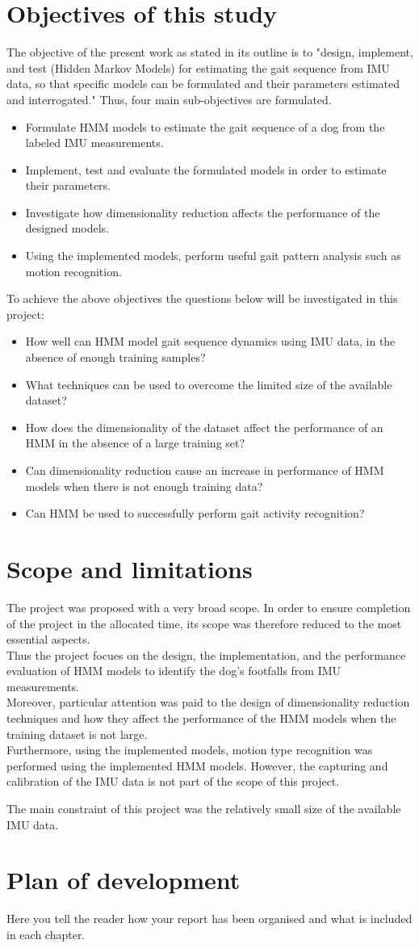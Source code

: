 \section{Objectives of this study}
The objective of the present work as stated in its outline is to "design, implement, and test (Hidden Markov Models) for estimating the gait sequence
from IMU data, so that specific models can be formulated and their
parameters estimated and interrogated." Thus, four main sub-objectives are formulated.
\begin{itemize}
	\item Formulate HMM models to estimate the gait sequence of a dog from the labeled IMU measurements.
	\item Implement, test and evaluate the formulated models in order to estimate their parameters.
	\item Investigate how dimensionality reduction affects the performance of the designed models.
	\item Using the implemented models, perform useful gait pattern analysis such as motion recognition.
\end{itemize}


To achieve the above objectives the questions below will be investigated in this project:
\begin{itemize}
	\item How well can HMM model gait sequence dynamics using IMU data, in the absence of enough training samples?
	\item What techniques can be used to overcome the limited size of the available dataset?
	\item How does the dimensionality of the dataset affect the performance of an HMM in the absence of a large training set?
	\item Can dimensionality reduction cause an increase in performance of HMM models when there is not enough training data?
	\item Can HMM be used to successfully perform gait activity recognition?
\end{itemize}


\section{Scope and limitations}
The project was proposed with a very broad scope. In order to ensure completion of the project in the allocated time, its scope was therefore reduced to the most essential aspects.\\
Thus the project focues on the design, the implementation, and the performance evaluation of HMM models to identify the dog's footfalls from IMU measurements.\\
Moreover, particular attention was paid to the design of dimensionality reduction techniques and how they affect the performance of the HMM models when the training dataset is not large.\\
Furthermore, using the implemented models, motion type recognition was performed using the implemented HMM models. However, the capturing and calibration of the IMU data is not part of the scope of this project.

The main constraint of this project was the relatively small size of the available IMU data.
\section{Plan of development}
Here you tell the reader how your report has been organised and what is included in each
chapter.
